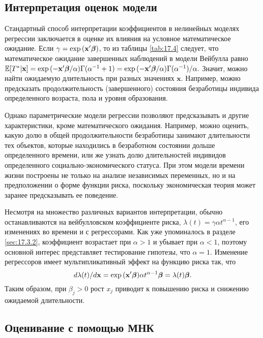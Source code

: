 \subsection{Интерпретация оценок модели}\label{sec:17.6.6}

\noindent
Стандартный способ интерпретации коэффициентов в нелинейных моделях регрессии заключается в оценке их влияния на условное математическое ожидание. Если $\gamma=\exp{(\mathbf{x}'\bm{\beta})}$, то из таблицы \ref{tab:17.4} следует, что математическое ожидание завершенных наблюдений в модели Вейбулла равно $\mathbb{E}[T^*|\mathbf{x}]=\exp{(-\mathbf{x}'\bm{\beta}/\alpha)}\Gamma(\alpha^{-1}+1)=\exp{(-\mathbf{x}'\bm{\beta}/\alpha)}\Gamma(\alpha^{-1})/\alpha.$ Значит, можно найти ожидаемую длительность при разных значениях $\mathbf{x}$. Например, можно предсказать продолжительность (завершенного) состояния безработицы индивида определенного возраста, пола и уровня образования.

Однако параметрические модели регрессии позволяют предсказывать и другие характеристики, кроме математического ожидания. Например, можно оценить, какую долю в общей продолжительности безработицы занимают длительности тех объектов, которые находились в безработном состоянии дольше определенного времени, или же узнать долю длительностей индивидов определенного социально-экономического статуса. %
При этом модели времени жизни построены не только на анализе независимых переменных, но и на предположении о форме функции риска, поскольку экономическая теория может заранее предсказывать ее поведение.

Несмотря на множество различных вариантов интерпретации, обычно останавливаются %
на вейбулловском коэффициенте риска, $\lambda(t)=\gamma\alpha t^{\alpha-1}$, его изменениях во времени и с регрессорами. Как уже упоминалось в разделе \ref{sec:17.3.2}, коэффициент возрастает при $\alpha>1$ и убывает при $\alpha<1$, поэтому основной интерес представляет тестирование гипотезы, что $\alpha=1$. Изменение регрессоров имеет мультипликативный эффект на функцию риска так, что
        $$d\lambda(t)/d\mathbf{x}=\exp{(\mathbf{x}'\bm{\beta})}\alpha t^{\alpha-1}\bm{\beta}=\lambda(t)\bm{\beta}.$$
Таким образом, при $\beta_j>0$ рост $x_j$ приводит к повышению риска и снижению ожидаемой длительности. %


\subsection{Оценивание с помощью МНК}\label{sec:17.6.7}

